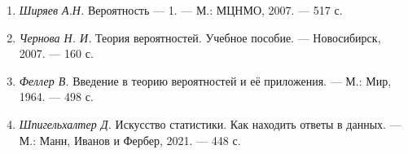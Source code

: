 \documentclass[11pt,a4paper]{article}
\providecommand{\tightlist}{%
      \setlength{\itemsep}{0pt}\setlength{\parskip}{0pt}}
\begin{document}
\begin{enumerate}
\def\labelenumi{\arabic{enumi}.}
\tightlist
\item
  \emph{Ширяев А.Н.} Вероятность --- 1. --- М.: МЦНМО, 2007. --- 517 с.
\item
  \emph{Чернова Н. И.} Теория вероятностей. Учебное пособие. ---
  Новосибирск, 2007. --- 160 с.
\item
  \emph{Феллер В.} Введение в теорию вероятностей и её приложения. ---
  М.: Мир, 1964. --- 498 с.
\item
  \emph{Шпигельхалтер Д.} Искусство статистики. Как находить ответы в
  данных. --- М.: Манн, Иванов и Фербер, 2021. --- 448 с.
\end{enumerate}


    
    
    
\end{document}
